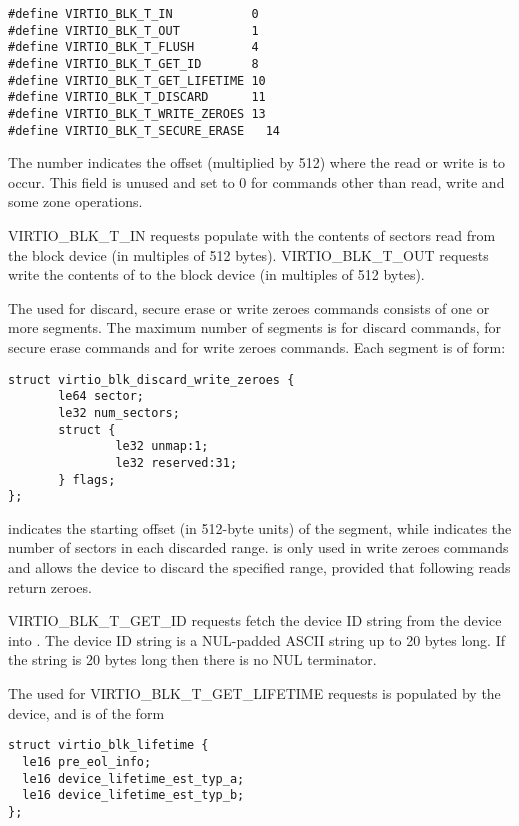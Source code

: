\begin{lstlisting}
#define VIRTIO_BLK_T_IN           0
#define VIRTIO_BLK_T_OUT          1
#define VIRTIO_BLK_T_FLUSH        4
#define VIRTIO_BLK_T_GET_ID       8
#define VIRTIO_BLK_T_GET_LIFETIME 10
#define VIRTIO_BLK_T_DISCARD      11
#define VIRTIO_BLK_T_WRITE_ZEROES 13
#define VIRTIO_BLK_T_SECURE_ERASE   14
\end{lstlisting}

The  number indicates the offset (multiplied by 512) where
the read or write is to occur. This field is unused and set to 0 for
commands other than read, write and some zone operations.

VIRTIO_BLK_T_IN requests populate  with the contents of sectors
read from the block device (in multiples of 512 bytes).  VIRTIO_BLK_T_OUT
requests write the contents of  to the block device (in multiples
of 512 bytes).

The  used for discard, secure erase or write zeroes commands
consists of one or more segments. The maximum number of segments is
 for discard commands,  for
secure erase commands and  for write zeroes
commands.
Each segment is of form:

\begin{lstlisting}
struct virtio_blk_discard_write_zeroes {
       le64 sector;
       le32 num_sectors;
       struct {
               le32 unmap:1;
               le32 reserved:31;
       } flags;
};
\end{lstlisting}

 indicates the starting offset (in 512-byte units) of the
segment, while  indicates the number of sectors in each
discarded range.  is only used in write zeroes commands and allows
the device to discard the specified range, provided that following reads return
zeroes.

VIRTIO_BLK_T_GET_ID requests fetch the device ID string from the device into
.  The device ID string is a NUL-padded ASCII string up to 20 bytes
long.  If the string is 20 bytes long then there is no NUL terminator.

The  used for VIRTIO_BLK_T_GET_LIFETIME requests is populated
by the device, and is of the form

\begin{lstlisting}
struct virtio_blk_lifetime {
  le16 pre_eol_info;
  le16 device_lifetime_est_typ_a;
  le16 device_lifetime_est_typ_b;
};
\end{lstlisting}

